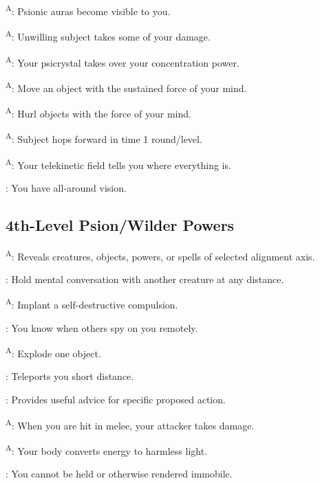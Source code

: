 \textsuperscript{A}: Psionic auras become visible to you.

\textsuperscript{A}: Unwilling subject takes some of your damage.

\textsuperscript{A}: Your psicrystal takes over your concentration power.

\textsuperscript{A}: Move an object with the sustained force of your mind.

\textsuperscript{A}: Hurl objects with the force of your mind.

\textsuperscript{A}: Subject hops forward in time 1 round/level.

\textsuperscript{A}: Your telekinetic field tells you where everything is.

: You have all-around vision.




\subsection{4th-Level Psion/Wilder Powers}

\textsuperscript{A}: Reveals creatures, objects, powers, or spells of selected alignment axis.

: Hold mental conversation with another creature at any distance.

\textsuperscript{A}: Implant a self-destructive compulsion.

: You know when others spy on you remotely.

\textsuperscript{A}: Explode one object.

: Teleports you short distance.

: Provides useful advice for specific proposed action.

\textsuperscript{A}: When you are hit in melee, your attacker takes damage.

\textsuperscript{A}: Your body converts energy to harmless light.

: You cannot be held or otherwise rendered immobile.

